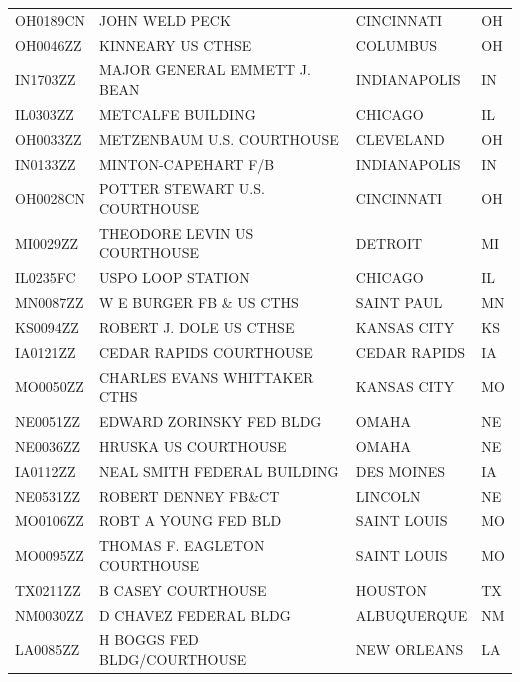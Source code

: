 \documentclass[12pt]{article}
\begin{document}
\begin{longtable}{llll}
OH0189CN         & JOHN WELD PECK                  & CINCINNATI     & OH    \\
OH0046ZZ         & KINNEARY US CTHSE               & COLUMBUS       & OH    \\
IN1703ZZ         & MAJOR GENERAL EMMETT J. BEAN    & INDIANAPOLIS   & IN    \\
IL0303ZZ         & METCALFE BUILDING               & CHICAGO        & IL    \\
OH0033ZZ         & METZENBAUM U.S. COURTHOUSE      & CLEVELAND      & OH    \\
IN0133ZZ         & MINTON-CAPEHART F/B             & INDIANAPOLIS   & IN    \\
OH0028CN         & POTTER STEWART U.S. COURTHOUSE  & CINCINNATI     & OH    \\
MI0029ZZ         & THEODORE LEVIN US COURTHOUSE    & DETROIT        & MI    \\
IL0235FC         & USPO LOOP STATION               & CHICAGO        & IL    \\
MN0087ZZ         & W E BURGER FB \& US CTHS        & SAINT PAUL     & MN    \\
KS0094ZZ         & ROBERT J. DOLE US CTHSE         & KANSAS CITY    & KS    \\
IA0121ZZ         & CEDAR RAPIDS COURTHOUSE         & CEDAR RAPIDS   & IA    \\
MO0050ZZ         & CHARLES EVANS WHITTAKER CTHS    & KANSAS CITY    & MO    \\
NE0051ZZ         & EDWARD ZORINSKY FED BLDG        & OMAHA          & NE    \\
NE0036ZZ         & HRUSKA US COURTHOUSE            & OMAHA          & NE    \\
IA0112ZZ         & NEAL SMITH FEDERAL BUILDING     & DES MOINES     & IA    \\
NE0531ZZ         & ROBERT DENNEY FB\&CT            & LINCOLN        & NE    \\
MO0106ZZ         & ROBT A YOUNG FED BLD            & SAINT LOUIS    & MO    \\
MO0095ZZ         & THOMAS F. EAGLETON COURTHOUSE   & SAINT LOUIS    & MO    \\
TX0211ZZ         & B CASEY COURTHOUSE              & HOUSTON        & TX    \\
NM0030ZZ         & D CHAVEZ FEDERAL BLDG           & ALBUQUERQUE    & NM    \\
LA0085ZZ         & H BOGGS FED BLDG/COURTHOUSE     & NEW ORLEANS    & LA    \\

\end{longtable}
\end{document}
